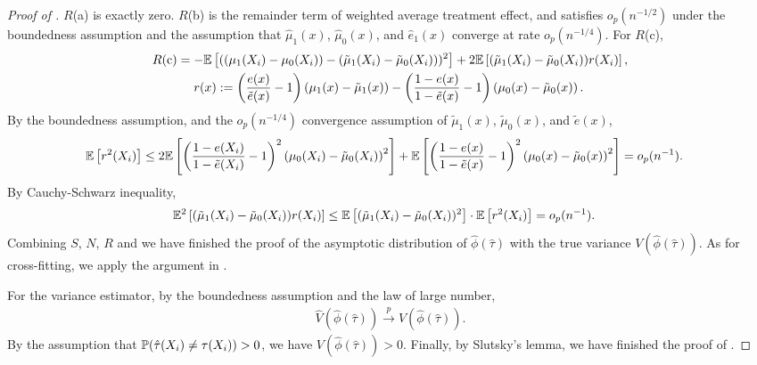 \begin{proof}[Proof of ]
    $R$(a) is exactly zero. 
    $R$(b) is the remainder term of weighted average treatment effect, and satisfies $o_p(n^{-1/2})$ under the boundedness assumption and the assumption that $\hat{\mu}_1(x)$, $\hat{\mu}_0(x)$, and $\hat{e}_1(x)$ converge at rate $o_p(n^{-1/4})$. 
    For $R$(c),
    \begin{align}\label{proof:absolute.error.R}
        \begin{split}
          R\text{(c)}
          &= -\mathbb{E}\left[((\mu_1(X_i) - \mu_0(X_i)) - (\tilde{\mu}_1(X_i) - \tilde{\mu}_0(X_i)))^2\right] + 2 \mathbb{E}\left[(\tilde{\mu}_1(X_i) - \tilde{\mu}_0(X_i)) r(X_i)\right], \\
          &\quad~r(x) := \left( \frac{e(x)}{\tilde{e}(x)} - 1 \right) \left( \mu_1(x) - \tilde{\mu}_1(x) \right) 
          - \left( \frac{1 - e(x)}{1 - \tilde{e}(x)} - 1 \right) \left( \mu_0(x) - \tilde{\mu}_0(x) \right).
        \end{split}
    \end{align}
    By the boundedness assumption, and the $o_p(n^{-1/4})$ convergence assumption of $\tilde{\mu}_1(x)$, $\tilde{\mu}_0(x)$, and $\tilde{e}(x)$,
    \begin{align*}
        \mathbb{E}\left[r^2(X_i)\right]
        &\le 2 \mathbb{E} \left[\left
        (\frac{1 - e(X_i)}{1 - \tilde{e}(X_i)} - 1 \right)^2 \left( \mu_0(X_i) - \tilde{\mu}_0(X_i) \right)^2\right]
        + \mathbb{E}\left[\left( \frac{1 - e(x)}{1 - \tilde{e}(x)} - 1 \right)^2 \left( \mu_0(x) - \tilde{\mu}_0(x) \right)^2\right]
        = o_p(n^{-1}).
    \end{align*}
    By Cauchy-Schwarz inequality, 
    \begin{align*}
        \mathbb{E}^2\left[(\tilde{\mu}_1(X_i) - \tilde{\mu}_0(X_i)) r(X_i)\right]
        &\le \mathbb{E}\left[(\tilde{\mu}_1(X_i) - \tilde{\mu}_0(X_i))^2\right] \cdot  \mathbb{E}\left[r^2(X_i)\right] 
        = o_p(n^{-1}).
    \end{align*}
    Combining $S$, $N$, $R$ and we have finished the proof of the asymptotic distribution of $\hat{\phi}(\hat{\tau})$ with the true variance ${V}(\hat{\phi}(\hat{\tau}))$.
    As for cross-fitting, we apply the argument in \cite{chernozhukov2018double}.
    

    For the variance estimator, by the boundedness assumption and the law of large number,
    \begin{align*}
        \hat{V}(\hat{\phi}(\hat{\tau})) \stackrel{p}{\to} {V}(\hat{\phi}(\hat{\tau})).
    \end{align*}
    By the assumption that $\mathbb{P}(\hat{\tau}(X_i) \neq {\tau}(X_i)) > 0$, we have ${V}(\hat{\phi}(\hat{\tau})) > 0$.
    Finally, by Slutsky's lemma, we have finished the proof of .
    
\end{proof}


